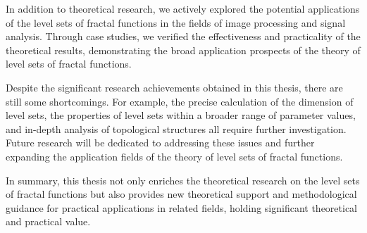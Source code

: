 In addition to theoretical research, we actively explored the potential applications of the level sets of fractal functions in the fields of image processing and signal analysis. Through case studies, we verified the effectiveness and practicality of the theoretical results, demonstrating the broad application prospects of the theory of level sets of fractal functions.

Despite the significant research achievements obtained in this thesis, there are still some shortcomings. For example, the precise calculation of the dimension of level sets, the properties of level sets within a broader range of parameter values, and in-depth analysis of topological structures all require further investigation. Future research will be dedicated to addressing these issues and further expanding the application fields of the theory of level sets of fractal functions.

In summary, this thesis not only enriches the theoretical research on the level sets of fractal functions but also provides new theoretical support and methodological guidance for practical applications in related fields, holding significant theoretical and practical value.